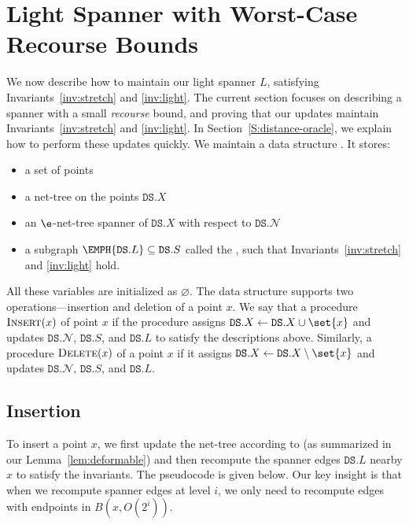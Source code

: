 \documentclass[11pt]{article}
\newcommand{\cN}{\mathcal{N}}
\newcommand{\DS}{\texttt{DS}}
\newcommand{\points}{{\ensuremath{\DS.X}}}
\newcommand{\sparse}{{\ensuremath{\DS.S}}}
\newcommand{\net}{{\ensuremath{\DS.\cN}}}
\newcommand{\light}{{\ensuremath{\DS.L}}}
\begin{document}
\section{Light Spanner with Worst-Case Recourse Bounds}
\label{S:recourse}

We now describe how to maintain our light spanner $L$, satisfying Invariants~\ref{inv:stretch} and \ref{inv:light}. The current section focuses on describing a spanner with a small \emph{recourse} bound, and proving that our updates maintain Invariants~\ref{inv:stretch} and \ref{inv:light}. 
In Section~\ref{S:distance-oracle}, we explain how to perform these updates quickly. 
We maintain a data structure \EMPH{\DS}. It stores:

\begin{itemize}
    \item a set of points \EMPH{$\points$}
    \item a net-tree \EMPH{$\net$} on the points $\points$
    \item an $\e$-net-tree spanner \EMPH{$\sparse$} of $\points$ with respect to $\net$ 
    \item a subgraph $\EMPH{\light} \subseteq \sparse$ called the , such that Invariants~\ref{inv:stretch} and \ref{inv:light} hold.
\end{itemize}

All these variables are initialized as $\varnothing$. The data structure supports two operations---insertion and deletion of a point $x$. We say that a procedure $\textsc{Insert}(x)$  of point $x$ if the procedure assigns $\points \gets \points \cup \set{x}$ and updates $\net$, $\sparse$, and $\light$ to satisfy the descriptions above. Similarly, a procedure $\textsc{Delete}(x)$  of a point $x$  if it assigns $\points \gets \points \setminus \set{x}$ and updates $\net$, $\sparse$, and $\light$.

\subsection{Insertion}
To insert a point $x$, we first update the net-tree according to \cite{gao2004deformable} (as summarized in our Lemma~\ref{lem:deformable})
and then recompute the spanner edges $\light$ nearby $x$ to satisfy the invariants. The pseudocode is given below. Our key insight is that when we recompute spanner edges at level $i$, we only need to recompute edges with endpoints in $B(x, O(2^i))$.
\end{document}
